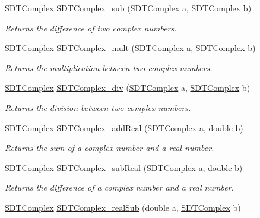 \begin{DoxyCompactItemize}
\hyperlink{struct_s_d_t_complex}{S\+D\+T\+Complex} \hyperlink{group__complex_ga8edae46f63b6b4bb9887a12b6842e54e}{S\+D\+T\+Complex\+\_\+sub} (\hyperlink{struct_s_d_t_complex}{S\+D\+T\+Complex} a, \hyperlink{struct_s_d_t_complex}{S\+D\+T\+Complex} b)
\begin{DoxyCompactList}\small\item\em Returns the difference of two complex numbers. \end{DoxyCompactList}\item 
\hyperlink{struct_s_d_t_complex}{S\+D\+T\+Complex} \hyperlink{group__complex_gaba87299809d4514703cb283c606b9a72}{S\+D\+T\+Complex\+\_\+mult} (\hyperlink{struct_s_d_t_complex}{S\+D\+T\+Complex} a, \hyperlink{struct_s_d_t_complex}{S\+D\+T\+Complex} b)
\begin{DoxyCompactList}\small\item\em Returns the multiplication between two complex numbers. \end{DoxyCompactList}\item 
\hyperlink{struct_s_d_t_complex}{S\+D\+T\+Complex} \hyperlink{group__complex_gaa162a50704fd0bf879953a9b2668471b}{S\+D\+T\+Complex\+\_\+div} (\hyperlink{struct_s_d_t_complex}{S\+D\+T\+Complex} a, \hyperlink{struct_s_d_t_complex}{S\+D\+T\+Complex} b)
\begin{DoxyCompactList}\small\item\em Returns the division between two complex numbers. \end{DoxyCompactList}\item 
\hyperlink{struct_s_d_t_complex}{S\+D\+T\+Complex} \hyperlink{group__complex_ga4be5b2b04dbfd45919bf64a7c67407e0}{S\+D\+T\+Complex\+\_\+add\+Real} (\hyperlink{struct_s_d_t_complex}{S\+D\+T\+Complex} a, double b)
\begin{DoxyCompactList}\small\item\em Returns the sum of a complex number and a real number. \end{DoxyCompactList}\item 
\hyperlink{struct_s_d_t_complex}{S\+D\+T\+Complex} \hyperlink{group__complex_gacd63301a8d4ba8f9b39e549e3f5726f9}{S\+D\+T\+Complex\+\_\+sub\+Real} (\hyperlink{struct_s_d_t_complex}{S\+D\+T\+Complex} a, double b)
\begin{DoxyCompactList}\small\item\em Returns the difference of a complex number and a real number. \end{DoxyCompactList}\item 
\hyperlink{struct_s_d_t_complex}{S\+D\+T\+Complex} \hyperlink{group__complex_ga5fd0b3a06607aeaea89b1bd7079a8a4b}{S\+D\+T\+Complex\+\_\+real\+Sub} (double a, \hyperlink{struct_s_d_t_complex}{S\+D\+T\+Complex} b)

\end{DoxyCompactItemize}
